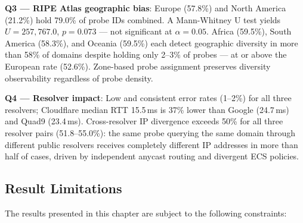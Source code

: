 \textbf{Q3 --- RIPE Atlas geographic bias}: Europe (57.8\%) and North America (21.2\%) hold 79.0\% of probe IDs combined. A Mann-Whitney U test yields $U = 257{,}767.0$, $p = 0.073$ --- not significant at $\alpha = 0.05$. Africa (59.5\%), South America (58.3\%), and Oceania (59.5\%) each detect geographic diversity in more than 58\% of domains despite holding only 2--3\% of probes --- at or above the European rate (52.6\%). Zone-based probe assignment preserves diversity observability regardless of probe density.

\textbf{Q4 --- Resolver impact}: Low and consistent error rates (1--2\%) for all three resolvers; Cloudflare median \ac{RTT} 15.5\,ms is 37\% lower than Google (24.7\,ms) and Quad9 (23.4\,ms). Cross-resolver \ac{IP} divergence exceeds 50\% for all three resolver pairs (51.8--55.0\%): the same probe querying the same domain through different public resolvers receives completely different \ac{IP} addresses in more than half of cases, driven by independent anycast routing and divergent \ac{ECS} policies.

\subsection{Result Limitations}
\label{subsec:4.6.2}

The results presented in this chapter are subject to the following constraints:

